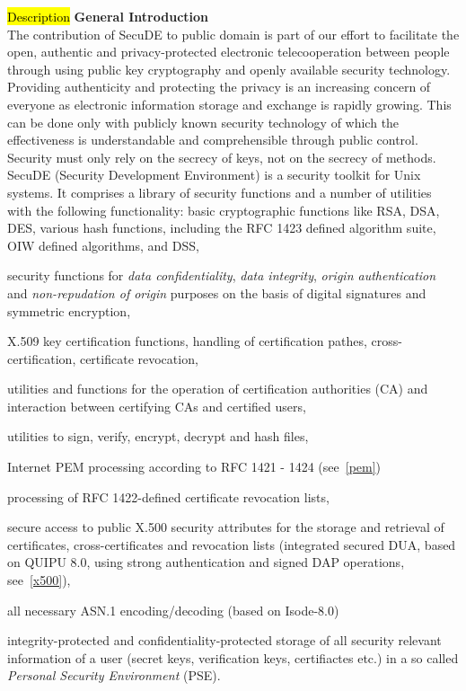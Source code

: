 \label{intro1}
\hl{Description}
{\bf General Introduction}
\\ [1em]
The contribution of SecuDE to public domain is part of our effort to 
facilitate the open, authentic and privacy-protected electronic 
telecooperation between people through using public key cryptography and openly 
available security technology. Providing authenticity and protecting the 
privacy is an increasing concern of everyone as electronic information 
storage and exchange is rapidly growing. This can be done only with publicly known
security technology of which the effectiveness is understandable and 
comprehensible through public control. Security must only rely on the secrecy
of keys, not on the secrecy of methods. 
\\ [1em]
SecuDE (Security Development Environment) is a security toolkit for
Unix systems. It comprises a library of security functions and a
number of utilities with the following functionality:
\bi
\m basic cryptographic functions like RSA, DSA, DES, various hash functions, 
   including the RFC 1423 defined algorithm suite, 
   OIW defined algorithms, and DSS,

\m security functions for {\em data confidentiality}, {\em data integrity}, 
   {\em origin authentication} and {\em non-repudation of origin} purposes 
   on the basis of digital signatures and symmetric encryption,

\m X.509 key certification functions, handling of certification pathes, 
   cross-certification, certificate revocation,

\m utilities and functions for the operation of certification authorities 
   (CA) and interaction between certifying CAs and certified users,

\m utilities to sign, verify, encrypt, decrypt and hash files,

\m Internet PEM processing according to RFC 1421 - 1424 (see~\ref{pem})

\m processing of RFC 1422-defined certificate revocation lists,

\m secure access to public X.500 security attributes for the storage 
   and retrieval of certificates, cross-certificates and revocation 
   lists (integrated secured DUA, based on QUIPU 8.0, using strong 
   authentication and signed DAP operations, see~\ref{x500}),

\m all necessary ASN.1 encoding/decoding (based on Isode-8.0)

\m integrity-protected and confidentiality-protected storage of all security 
   relevant information of a user (secret keys, verification keys, certifiactes
   etc.) in a so called {\em Personal Security Environment} (PSE).
\ei
 
